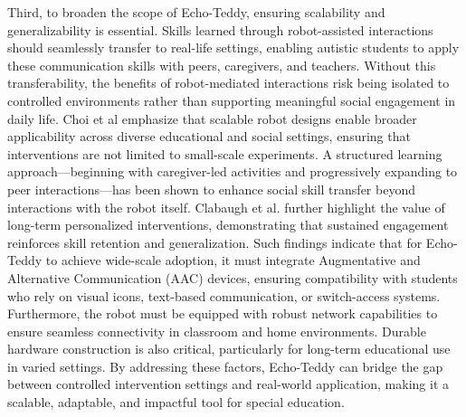 Third, to broaden the scope of Echo-Teddy, ensuring scalability and generalizability is essential. Skills learned through robot-assisted interactions should seamlessly transfer to real-life settings, enabling autistic students to apply these communication skills with peers, caregivers, and teachers. Without this transferability, the benefits of robot-mediated interactions risk being isolated to controlled environments rather than supporting meaningful social engagement in daily life.  Choi et al \cite{santos2023applications} emphasize that scalable robot designs enable broader applicability across diverse educational and social settings, ensuring that interventions are not limited to small-scale experiments. A structured learning approach—beginning with caregiver-led activities and progressively expanding to peer interactions—has been shown to enhance social skill transfer beyond interactions with the robot itself. Clabaugh et al. \cite{clabaugh2019long} further highlight the value of long-term personalized interventions, demonstrating that sustained engagement reinforces skill retention and generalization. Such findings indicate that for Echo-Teddy to achieve wide-scale adoption, it must integrate Augmentative and Alternative Communication (AAC) devices, ensuring compatibility with students who rely on visual icons, text-based communication, or switch-access systems. Furthermore, the robot must be equipped with robust network capabilities to ensure seamless connectivity in classroom and home environments. Durable hardware construction is also critical, particularly for long-term educational use in varied settings. By addressing these factors, Echo-Teddy can bridge the gap between controlled intervention settings and real-world application, making it a scalable, adaptable, and impactful tool for special education.







